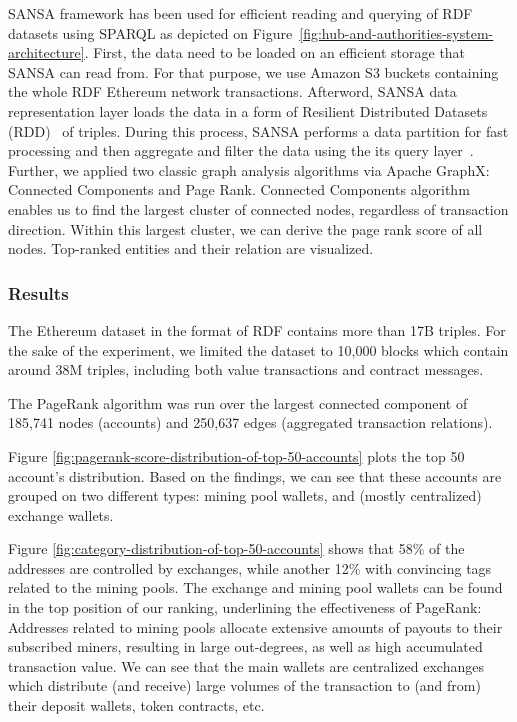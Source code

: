 SANSA framework has been used for efficient reading and querying of RDF datasets using SPARQL as depicted on Figure~\ref{fig:hub-and-authorities-system-architecture}. 
First, the data need to be loaded on an efficient storage that SANSA can read from. 
For that purpose, we use Amazon S3 buckets containing the whole RDF Ethereum network transactions.
Afterword, SANSA data representation layer loads the data in a form of Resilient Distributed Datasets (RDD)~\cite{zaharia2012resilient} of triples. 
During this process, SANSA performs a data partition for fast processing and then aggregate and filter the data using the its query layer~\cite{iermilov-2017-sansa-iswc-demo}. Further, we applied two classic graph analysis algorithms via Apache GraphX: Connected Components and Page Rank.
Connected Components algorithm enables us to find the largest cluster of connected nodes, regardless of transaction direction. Within this largest cluster, we can derive the page rank score of all nodes. Top-ranked entities and their relation are visualized.

\subsubsection{Results}

The Ethereum dataset in the format of RDF contains more than 17B triples.
For the sake of the experiment, we limited the dataset to 10,000 blocks which contain around 38M triples, including both value transactions and contract messages.

The PageRank algorithm was run over the largest connected component of 185,741 nodes (accounts) and 250,637 edges (aggregated transaction relations).

Figure \ref{fig:pagerank-score-distribution-of-top-50-accounts} plots the top 50 account's distribution. 
Based on the findings, we can see that these accounts are grouped on two different types: mining pool wallets, and (mostly centralized) exchange wallets. 

Figure \ref{fig:category-distribution-of-top-50-accounts} shows that 58\% of the addresses are controlled by exchanges, while another 12\% with convincing tags related to the mining pools.
The exchange and mining pool wallets can be found in the top position of our ranking, underlining the effectiveness of PageRank: Addresses related to mining pools allocate extensive amounts of payouts to their subscribed miners, resulting in large out-degrees, as well as high accumulated transaction value.
We can see that the main wallets are centralized exchanges which distribute (and receive) large volumes of the transaction to (and from) their deposit wallets, token contracts, etc.


